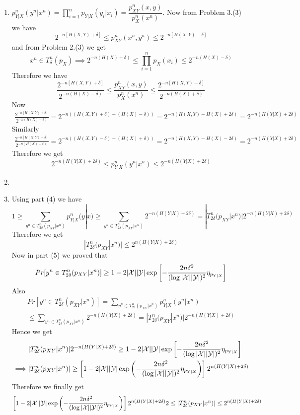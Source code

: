 \documentclass[a4paper, 11pt]{article}
\begin{document}
{\begin{enumerate}
		
		\item $p_{Y|X}^n(y^n|x^n)=\prod\limits_{i=1}^np_{Y|X}(y_i|x_i)=\dfrac{p_{XY}^n(x,y)}{p_X^n(x^n)}$. Now from Problem 3.(3) we have $$2^{-n[H(X,Y)+\delta]}\leq p_{XY}^n(x^n,y^n)\leq 2^{-n[H(X,Y)-\delta]}$$ and from Problem 2.(3) we get 
		$$x^n\in T_{\delta}^n(p_X)\implies 2^{-n(H(X)+\delta)}\leq \prod_{i=1}^np_X(x_i)\leq 2^{-n(H(X)-\delta)}$$Therefore we have $$\frac{2^{-n[H(X,Y)+\delta]}}{2^{-n(H(X)-\delta)}}\leq \dfrac{p_{XY}^n(x,y)}{p_X^n(x^n)}\leq \frac{2^{-n[H(X,Y)-\delta]}}{2^{-n(H(X)+\delta)}}$$Now \begin{multline*}
			\frac{2^{-n[H(X,Y)+\delta]}}{2^{-n(H(X)-\delta)}} = 2^{-n((H(X,Y)+\delta)-(H(X)-\delta))}
			=2^{-n(H(X,Y)-H(X)+2\delta)}=2^{-n(H(Y|X)+2\delta)}
		\end{multline*}Similarly \begin{multline*}
		\frac{2^{-n[H(X,Y)-\delta]}}{2^{-n(H(X)+\delta)]}} = 2^{-n((H(X,Y)-\delta)-(H(X)+\delta))}
		=2^{-n(H(X,Y)-H(X)-2\delta)}=2^{-n(H(Y|X)+2\delta)}
		\end{multline*}Therefore we get $$2^{-n(H(Y|X)+2\delta)}\leq p_{Y|X}^n(y^n|x^n)\leq 2^{-n(H(Y|X)+2\delta)}$$
		
		\item 
		
	
		\item Using part (4) we have 
		$$ 1\geq \sum_{y^n\in T_{2\delta}^n(p_{XY}|x^n)}p^n_{Y|X}(y|x)\geq \sum_{y^n\in T_{2\delta}^n(p_{XY}|x^n)}2^{-n(H(Y|X)+2\delta)}=|T_{2\delta}^n(p_{XY}|x^n)|2^{-n(H(Y|X)+2\delta)}$$Therefore we get $$|T_{2\delta}^n(p_{XY}|x^n)|\leq 2^{n(H(Y|X)+2\delta)}$$
		Now in part (5) we proved that $$Pr[y^n\in T_{2\delta}^n(p_{XY}|x^n)]\geq 1-2|\mathcal{X}||\mathcal{Y}|\exp\left[ -\frac{2n\delta^2}{(\log |\mathcal{X}||\mathcal{Y}|)^2} \eta_{p_{Y|X}}\right]$$Also \begin{multline*}
			Pr[y^n\in T_{2\delta}^n(p_{XY}|x^n)]=\sum_{y^n\in T_{2\delta}^n(p_{XY}|x^n)}p_{Y|X}^n(y^n|x^n)\\
			\leq \sum_{y^n\in T_{2\delta}^n(p_{XY}|x^n)}2^{-n(H(Y|X)+2\delta)}=|T_{2\delta}^n(p_{XY}|x^n)|2^{-n(H(Y|X)+2\delta)}
		\end{multline*}Hence we get \begin{align*}
		&|T_{2\delta}^n(p_{XY}|x^n)|2^{-n(H(Y|X)+2\delta)}\geq 1-2|\mathcal{X}||\mathcal{Y}|\exp\left[ -\frac{2n\delta^2}{(\log |\mathcal{X}||\mathcal{Y}|)^2} \eta_{p_{Y|X}}\right]\\
		\implies & |T_{2\delta}^n(p_{XY}|x^n)|\geq \left[ 1-2|\mathcal{X}||\mathcal{Y}|\exp\left( -\frac{2n\delta^2}{(\log |\mathcal{X}||\mathcal{Y}|)^2} \eta_{p_{Y|X}}\right) \right]2^{n(H(Y|X)+2\delta)}
		\end{align*}Therefore we finally get $$\left[ 1-2|\mathcal{X}||\mathcal{Y}|\exp\left( -\frac{2n\delta^2}{(\log |\mathcal{X}||\mathcal{Y}|)^2} \eta_{p_{Y|X}}\right) \right]2^{n(H(Y|X)+2\delta)}2\leq  |T_{2\delta}^n(p_{XY}|x^n)|\leq 2^{n(H(Y|X)+2\delta)}$$
	\end{enumerate}
}
\pagebreak
\end{document}
